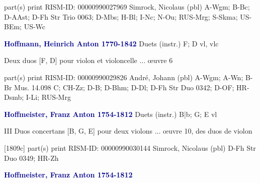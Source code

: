 \documentclass[twocolumn]{book}
\begin{document}
\newline \textcolor{darkblue}{}  part(s)  
\newline print
\newline RISM-ID: 00000990027969
\newline Simrock, Nicolaus  (pbl)
\newline A-Wgm; B-Bc; D-AAst; D-Fh  Str Trio 0063; D-Mbs; H-Bl; I-Nc; N-Ou; RUS-Mrg; S-Skma; US-BEm; US-Wc
\newline \par \vspace{7pt} \textcolor{darkblue}{\textbf{Hoffmann, Heinrich Anton  1770-1842}}
\newline Duets (instr.)  F; D  
\newline vl, vlc
\newline \begin{itshape}Deux duos [F, D] pour violon et violoncelle ... œuvre 6\end{itshape} 
\newline \textcolor{darkblue}{}  part(s)  
\newline print
\newline RISM-ID: 00000990029826
\newline André, Johann  (pbl)
\newline A-Wgm; A-Wn; B-Br  Mus. 14.098 C; CH-Zz; D-B; D-Bhm; D-Dl; D-Fh  Str Duo 0342; D-OF; HR-Dsmb; I-Li; RUS-Mrg
\newline \par \vspace{7pt} \textcolor{darkblue}{\textbf{Hoffmeister, Franz Anton  1754-1812}}
\newline Duets (instr.)  B|b; G; E  
 vl
\newline \begin{itshape}III Duos concertans [B, G, E] pour deux violons ... œuvre 10, des duos de violon\end{itshape} 
\newline \textcolor{darkblue}{}  [1809c]  part(s)  
\newline print
\newline RISM-ID: 00000990030144
\newline Simrock, Nicolaus  (pbl)
\newline D-Fh  Str Duo 0349; HR-Zh
\newline \par \vspace{7pt} \textcolor{darkblue}{\textbf{Hoffmeister, Franz Anton  1754-1812}}
\end{document}
